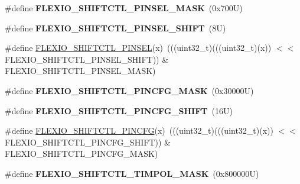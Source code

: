 \begin{DoxyCompactItemize}
\#define {\bfseries F\+L\+E\+X\+I\+O\+\_\+\+S\+H\+I\+F\+T\+C\+T\+L\+\_\+\+P\+I\+N\+S\+E\+L\+\_\+\+M\+A\+SK}~(0x700\+U)
\item 
\mbox{\label{group___f_l_e_x_i_o___register___masks_gaac11b3aa32d006b02de895070a8daf9c}} 
\#define {\bfseries F\+L\+E\+X\+I\+O\+\_\+\+S\+H\+I\+F\+T\+C\+T\+L\+\_\+\+P\+I\+N\+S\+E\+L\+\_\+\+S\+H\+I\+FT}~(8\+U)
\item 
\#define \mbox{\hyperlink{group___f_l_e_x_i_o___register___masks_ga920d6a461590cb0d969c5b04ab555627}{F\+L\+E\+X\+I\+O\+\_\+\+S\+H\+I\+F\+T\+C\+T\+L\+\_\+\+P\+I\+N\+S\+EL}}(x)~(((uint32\+\_\+t)(((uint32\+\_\+t)(x)) $<$$<$ F\+L\+E\+X\+I\+O\+\_\+\+S\+H\+I\+F\+T\+C\+T\+L\+\_\+\+P\+I\+N\+S\+E\+L\+\_\+\+S\+H\+I\+FT)) \& F\+L\+E\+X\+I\+O\+\_\+\+S\+H\+I\+F\+T\+C\+T\+L\+\_\+\+P\+I\+N\+S\+E\+L\+\_\+\+M\+A\+SK)
\item 
\mbox{\label{group___f_l_e_x_i_o___register___masks_gab21f02941e0e2a19a154c2ddf7cb9119}} 
\#define {\bfseries F\+L\+E\+X\+I\+O\+\_\+\+S\+H\+I\+F\+T\+C\+T\+L\+\_\+\+P\+I\+N\+C\+F\+G\+\_\+\+M\+A\+SK}~(0x30000\+U)
\item 
\mbox{\label{group___f_l_e_x_i_o___register___masks_gaeaaca709115ef8a8373c55a8dcd95805}} 
\#define {\bfseries F\+L\+E\+X\+I\+O\+\_\+\+S\+H\+I\+F\+T\+C\+T\+L\+\_\+\+P\+I\+N\+C\+F\+G\+\_\+\+S\+H\+I\+FT}~(16\+U)
\item 
\#define \mbox{\hyperlink{group___f_l_e_x_i_o___register___masks_gaf3c6724734a16a0ccf47a72c5c816e46}{F\+L\+E\+X\+I\+O\+\_\+\+S\+H\+I\+F\+T\+C\+T\+L\+\_\+\+P\+I\+N\+C\+FG}}(x)~(((uint32\+\_\+t)(((uint32\+\_\+t)(x)) $<$$<$ F\+L\+E\+X\+I\+O\+\_\+\+S\+H\+I\+F\+T\+C\+T\+L\+\_\+\+P\+I\+N\+C\+F\+G\+\_\+\+S\+H\+I\+FT)) \& F\+L\+E\+X\+I\+O\+\_\+\+S\+H\+I\+F\+T\+C\+T\+L\+\_\+\+P\+I\+N\+C\+F\+G\+\_\+\+M\+A\+SK)
\item 
\mbox{\label{group___f_l_e_x_i_o___register___masks_gae333cdbb76117aee34a0bb0154b0bdc9}} 
\#define {\bfseries F\+L\+E\+X\+I\+O\+\_\+\+S\+H\+I\+F\+T\+C\+T\+L\+\_\+\+T\+I\+M\+P\+O\+L\+\_\+\+M\+A\+SK}~(0x800000\+U)
\item 
\mbox{\label{group___f_l_e_x_i_o___register___masks_ga2713c0fc86864b427fe555d4349eb1a3}} 

\end{DoxyCompactItemize}
